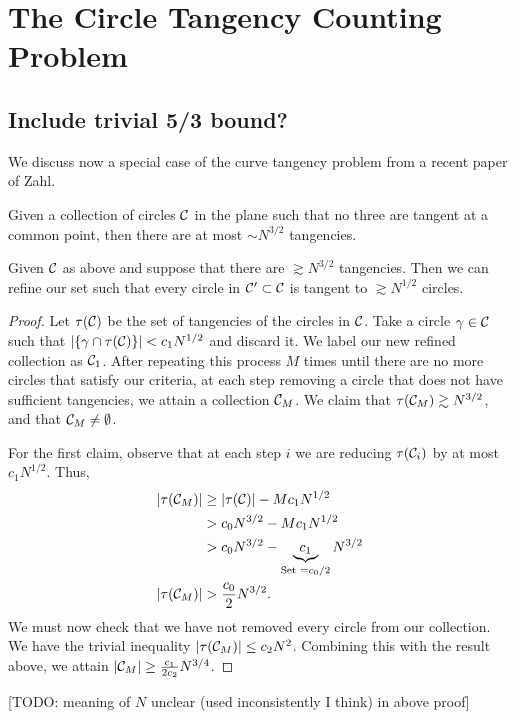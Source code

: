 \chapter{The Circle Tangency Counting Problem}
\section{Include trivial 5/3 bound?}

We discuss now a special case of the curve tangency problem from a recent paper of Zahl. \cite{ellenberg2016new}

\begin{theorem}
    Given a collection of circles $\mathcal C$ in the plane such that no three are tangent at a common point, then there are at most $\sim N^{3/2}$ tangencies. 
\end{theorem}
\begin{lemma}
    Given $\mathcal C$ as above and suppose that there are $\gtrsim N^{3/2}$ tangencies. Then we can refine our set such that every circle in $\mathcal C' \subset \mathcal C$ is tangent to $\gtrsim N^{1/2}$ circles.
\end{lemma}
\begin{proof}
Let $\tau(\mathcal C)$ be the set of tangencies of the circles in $\mathcal C$. Take a circle $\gamma \in \mathcal C$ such that $|\{\gamma \cap \tau(\mathcal C)\}| < c_1 N^{1/2}$
and discard it. We label our new refined collection as $\mathcal C_1$. After repeating this process $M$ times until there are no more circles that satisfy our criteria, at each step removing a circle that does not have sufficient
tangencies, we attain a collection $\mathcal C_M$. We claim that $\tau(\mathcal C_M) \gtrsim N^{3/2}$, and that $\mathcal C_M \neq \emptyset$.

For the first claim, observe that at each step $i$ we are reducing $\tau(\mathcal C_i)$ by at most $c_1 N^{1/2}$.  Thus,
\begin{align*}
    |\tau(\mathcal C_M)| &\geq |\tau(\mathcal C)| - M c_1 N^{1/2} \\
    &> c_0 N^{3/2} -  M c_1 N^{1/2} \\ 
    &> c_0 N^{3/2} - \underbrace{c_1}_{\text{Set } = c_0/2} N^{3/2} \\
    |\tau(\mathcal C_M)| &> \frac{c_0}{2} N^{3/2}.
\end{align*}
We must now check that we have not removed every circle from our collection. We have the trivial inequality $|\tau(\mathcal C_M)| \leq c_2 N^{2}$. Combining this with the result above, we attain $|\mathcal C_M| \geq \frac{c_1}{2c_2} N^{3/4}$.
\end{proof}
[TODO: meaning of $N$ unclear (used inconsistently I think) in above proof]
